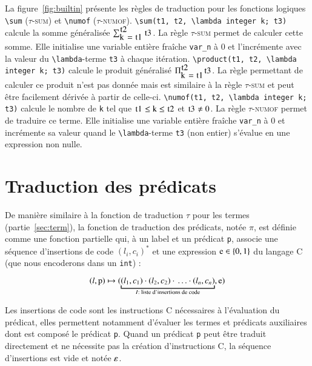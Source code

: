 La figure~\ref{fig:builtin} présente les règles de traduction pour les fonctions
logiques \lstinline'\sum' (\textsc{$\tau$-sum}) et \lstinline'\numof'
(\textsc{$\tau$-numof}).
\lstinline'\sum(t1, t2, \lambda integer k; t3)' calcule la somme généralisée
$\sum_{\mbox{\lstinline'k = t1'}}^{\mbox{\lstinline't2'}}\mbox{\lstinline't3'}$.
La règle \textsc{$\tau$-sum} permet de calculer cette somme.
Elle initialise une variable entière fraîche \lstinline'var_n' à $0$ et
l'incrémente avec la valeur du \lstinline'\lambda'-terme \lstinline't3' à chaque
itération.
\lstinline'\product(t1, t2, \lambda integer k; t3)' calcule le produit
généralisé $\Pi_{\mbox{\lstinline'k = t1'}}^{\mbox{\lstinline't2'}}\mbox{\lstinline't3'}$.
La règle permettant de calculer ce produit n'est pas donnée mais est similaire à
la règle \textsc{$\tau$-sum} et peut être facilement dérivée à partir de
celle-ci.
\lstinline'\numof(t1, t2, \lambda integer k; t3)' calcule le nombre de
\lstinline'k' tel que
$\mbox{\lstinline't1'} \le \mbox{\lstinline'k'} \le \mbox{\lstinline't2'}$ et
$\mbox{\lstinline't3'} \neq 0$.
La règle \textsc{$\tau$-numof} permet de traduire ce terme.
Elle initialise une variable entière fraîche \lstinline'var_n' à $0$ et
incrémente sa valeur quand le \lstinline'\lambda'-terme \lstinline't3' (non
entier) s'évalue en une expression non nulle.


\section{Traduction des prédicats \eacsl}
\label{sec:pred}


De manière similaire à la fonction de traduction $\tau$ pour les termes
(partie~\ref{sec:term}), la fonction de traduction des prédicats, notée $\pi$,
est définie comme une fonction partielle qui, à un label et un prédicat \eacsl
\lstinline'p', associe une séquence d'insertions de code $(l_i, c_i)^*$ et une
expression $\mbox{\lstinline'e'} \in \{0, 1\}$ du langage C (que nous encoderons
dans un \lstinline'int') :

\[
(l, \mbox{\lstinline'p'}) \rulearrow
(\underbracket{(l_1, c_1) \concat (l_2, c_2) \concat \ldots
  \concat (l_n, c_n)}_{I : \text{ liste d'insertions de code}}, \mbox{\lstinline'e'})
\]

Les insertions de code sont les instructions C nécessaires à l'évaluation du
prédicat, elles permettent notamment d'évaluer les termes et prédicats
auxiliaires dont est composé le prédicat \lstinline'p'.
Quand un prédicat \lstinline'p' peut être traduit directement et ne nécessite
pas la création d'instructions C, la séquence d'insertions est vide et notée
$\varepsilon$.

